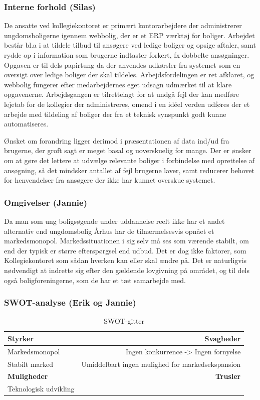\documentclass[12pt, a4paper]{report}
\begin{document}
  \subsubsection{Interne forhold (Silas)}
De ansatte ved kollegiekontoret er primært kontorarbejdere der administrerer ungdomsboligerne igennem webbolig, der er et ERP værktøj for boliger. Arbejdet består bl.a i at tildele tilbud til ansøgere ved ledige boliger og opsige aftaler, samt rydde op i information som brugerne indtaster forkert, fx dobbelte ansøgninger. Opgaven er til dels papirtung da der anvendes udkørsler fra systemet som en oversigt over ledige boliger der skal tildeles. Arbejdsfordelingen er ret afklaret, og webbolig fungerer efter medarbejdernes eget udsagn udmærket til at klare opgavenerne. Arbejdsgangen er tilrettelagt for at undgå fejl der kan medføre lejetab for de kollegier der administreres, omend i en idéel verden udføres der et arbejde med tildeling af boliger der fra et teknisk synspunkt godt kunne automatiseres.


Ønsket om forandring ligger derimod i præsentationen af data ind/ud fra brugerne, der groft sagt er meget basal og uoverskuelig for mange. Der er ønsker om at gøre det lettere at udvælge relevante boliger i forbindelse med oprettelse af ansøgning, så det mindsker antallet af fejl brugerne laver, samt reducerer behovet for henvendelser fra ansøgere der ikke har kunnet overskue systemet.

  \subsubsection{Omgivelser (Jannie)}
Da man som ung boligsøgende under uddannelse reelt ikke har et andet alternativ end ungdomsbolig Århus har de tilnærmelsesvis opnået et markedsmonopol. Markedssituationen i sig selv må ses som værende stabilt, om end der typisk er større efterspørgsel end udbud. Det er dog ikke faktorer, som Kollegiekontoret som sådan hverken kan eller skal ændre på. Det er naturligvis nødvendigt at indrette sig efter den gældende lovgivning på området, og til dels også boligforeningerne, som de har et tæt samarbejde med.

\subsubsection{SWOT-analyse (Erik og Jannie)}
\begin{table}[ht]
\caption{SWOT-gitter}
\begin{tabular}{ | l | r | }
\hline
{\bf Styrker} & {\bf Svagheder} \\ \hline
Markedsmonopol & Ingen konkurrence -> Ingen fornyelse \\
Stabilt marked & Umiddelbart ingen mulighed for markedsekspansion \\ \hline
{\bf Muligheder} & {\bf Trusler} \\ \hline
Teknologisk udvikling & \\
\hline
\end{tabular}
\end{table}
\end{document}
